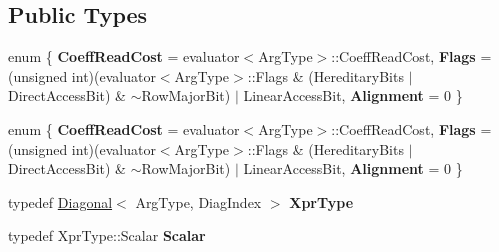 \subsection*{Public Types}
\begin{DoxyCompactItemize}
\item 
\mbox{\label{struct_eigen_1_1internal_1_1evaluator_3_01_diagonal_3_01_arg_type_00_01_diag_index_01_4_01_4_a9d23aa751ad94486c38c336166b0860b}} 
enum \{ {\bfseries Coeff\+Read\+Cost} = evaluator$<$Arg\+Type$>$\+:\+:Coeff\+Read\+Cost, 
{\bfseries Flags} = (unsigned int)(evaluator$<$Arg\+Type$>$\+:\+:Flags \& (Hereditary\+Bits $\vert$ Direct\+Access\+Bit) \& $\sim$\+Row\+Major\+Bit) $\vert$ Linear\+Access\+Bit, 
{\bfseries Alignment} = 0
 \}
\item 
\mbox{\label{struct_eigen_1_1internal_1_1evaluator_3_01_diagonal_3_01_arg_type_00_01_diag_index_01_4_01_4_a52586a981cabee394933bb76f5400b6d}} 
enum \{ {\bfseries Coeff\+Read\+Cost} = evaluator$<$Arg\+Type$>$\+:\+:Coeff\+Read\+Cost, 
{\bfseries Flags} = (unsigned int)(evaluator$<$Arg\+Type$>$\+:\+:Flags \& (Hereditary\+Bits $\vert$ Direct\+Access\+Bit) \& $\sim$\+Row\+Major\+Bit) $\vert$ Linear\+Access\+Bit, 
{\bfseries Alignment} = 0
 \}
\item 
\mbox{\label{struct_eigen_1_1internal_1_1evaluator_3_01_diagonal_3_01_arg_type_00_01_diag_index_01_4_01_4_af8d8122c47cefe5091e1a5c6a7c83d54}} 
typedef \hyperlink{group___core___module_class_eigen_1_1_diagonal}{Diagonal}$<$ Arg\+Type, Diag\+Index $>$ {\bfseries Xpr\+Type}
\item 
\mbox{\label{struct_eigen_1_1internal_1_1evaluator_3_01_diagonal_3_01_arg_type_00_01_diag_index_01_4_01_4_a59d72134d342c3bb4bafbe2dd9374b58}} 
typedef Xpr\+Type\+::\+Scalar {\bfseries Scalar}
\item 
\mbox{\label{struct_eigen_1_1internal_1_1evaluator_3_01_diagonal_3_01_arg_type_00_01_diag_index_01_4_01_4_abaca8da26790e218ea261aa6ee17dead}} 

\end{DoxyCompactItemize}
